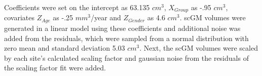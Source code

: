 Coefficients were set on the intercept as 63.135 $cm^3$, $X_{Group}$ as -.95 $cm^3$, covariates $Z_{Age}$ as -.25 $mm^3$/year and $Z_{Gender}$ as 4.6 $cm^3$. scGM volumes were generated in a linear model using these coefficients and additional noise was added from the  residuals, which were sampled from a normal distribution with zero mean and standard deviation 5.03 $cm^3$. Next, the scGM volumes were scaled by each site's calculated scaling factor and gaussian noise from the residuals of the scaling factor fit were added.